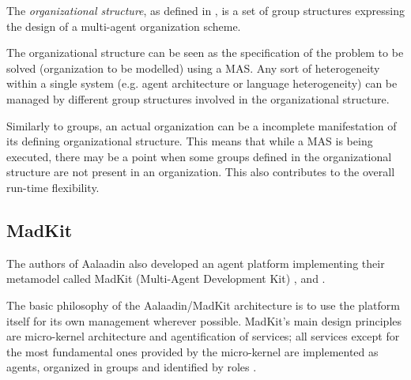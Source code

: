 The \textit{organizational structure}, as defined in \cite{Ferber97}, is a set of group structures expressing the design of a multi-agent organization scheme.

The organizational structure can be seen as the specification of the problem to be solved (organization to be modelled) using a MAS.
Any sort of heterogeneity within a single system (e.g. agent architecture or language heterogeneity) can be managed by different group structures involved in the organizational structure.

Similarly to groups, an actual organization can be a incomplete manifestation of its defining organizational structure.
This means that while a MAS is being executed, there may be a point when some groups defined in the organizational structure are not present in an organization.
This also contributes to the overall run-time flexibility.

\subsection{MadKit}

The authors of Aalaadin also developed an agent platform implementing their metamodel called MadKit (Multi-Agent Development Kit)
\cite{Ferber97}, \cite{Ferber98} and \cite{Gutknecht00}.

The basic philosophy of the Aalaadin/MadKit architecture is to use the platform itself for its own management wherever possible.
MadKit's main design principles are micro-kernel architecture and agentification of services;
all services except for the most fundamental ones provided by the micro-kernel are implemented as agents, organized in groups and identified by roles \cite{Ferber98}.
